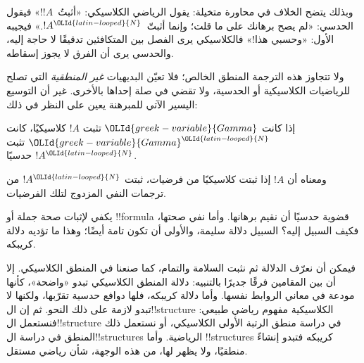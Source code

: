 \documentclass[../../../include/open-logic-section]{subfiles}
\begin{document}
وبذلك يتضح الخلاف في محاورة متخيلة: يقول الرياضي الكلاسيكي:
«أثبتُ~$!A$!» فيقول الحدسي: «لم يصح برهانك على ما قلت؛ وإنما
أثبتّ~$!A^{\OLId{latin-looped}{N}}$.» فيجيبه الأول: «وحسبي هذا!» فالكلاسيكي يرى
الفصل بين المتكافئين تدقيقًا لا حاجة إليه، والحدسي يرى أن
الفرق لا يجوز إسقاطه.

ولا تتجاوز هذه الترجمة المنطق الخالص؛ فلا تعيّن البديهيات
\emph{غير المنطقية} التي تصلح للرياضيات الكلاسيكية أو الحدسية،
ولا تقضي في صلة إحداها بالأخرى. غير أن التوسيع اليسير الآتي
للمبرهنة يعين على النظر في ذلك:

\begin{thm}
إذا كانت ${\OLId{greek-variable}{Gamma}}$ تثبت $!A$ كلاسيكيًا، كانت ${\OLId{greek-variable}{Gamma}}^{\OLId{latin-looped}{N}}$ تثبت $!A^{\OLId{latin-looped}{N}}$
حدسيًا.
\end{thm}

ومعناه أن $!A$ إذا ثبتت كلاسيكيًا من فرضيات، ثبتت
$!A^{\OLId{latin-looped}{N}}$ من ترجمات النفي المزدوج لتلك الفرضيات.

يكفي لإثبات صحة جملة أو !!{formula} قضوية حدسيًا أن نقيم
برهانها. وأما نفي صحتها، فكيف السبيل إليه؟ السبيل دلالة
سليمة، والأولى أن تكون تامة أيضًا؛ وهذا ما تؤديه دلالة كريبكه.

فيمكن أن نعرّف الدلالة ثم نثبت السلامة والتمام، كما صنعنا في
المنطق الكلاسيكي. إلا أن بين المقامين فرقًا جديرًا بالتنبيه:
دلالة المنطق الكلاسيكي تبدو «واضحة»، كأنها مودعة في معاني
الروابط نفسها. وأما دلالة كريبكه، فلها دوافع حدسية تقرّبها،
ولكنها لا تبدو لازمة على ذلك النحو. ثم إن ال!!{structure}
الكلاسيكية مفهوم رياضي طبيعي: فنستعمل ال!!{structure} في
دراسة منطق الرتبة الأولى الكلاسيكي، أو نستعمل ذلك المنطق في
دراسة ال!!{structure}s الرياضية. وأما !!{structure}s كريبكه
فتبدو إنشاءً منطقيًا، ولا يظهر لها، من هذه الوجهة، شأن رياضي
مستقل.
\end{document}
